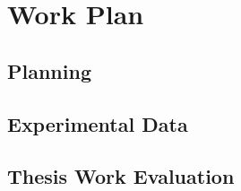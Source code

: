 \chapter{Work Plan} \label{chap:workplan}

\section*{}

\section{Planning}\label{sec:planning}

\section{Experimental Data}\label{sec:datasets}

\section{Thesis Work Evaluation}\label{sec:eval}
